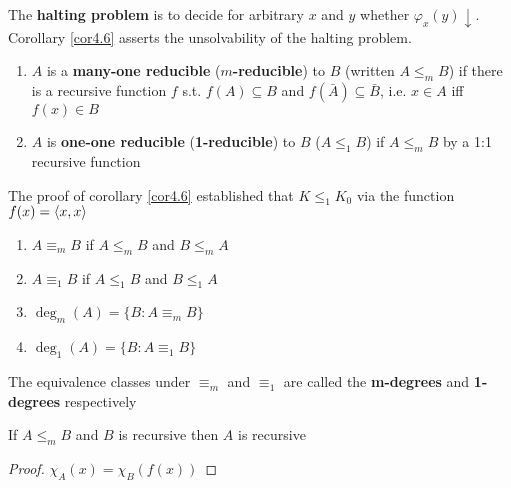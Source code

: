 \documentclass[11pt]{article}
\begin{document}
The \textbf{halting problem} is to decide for arbitrary \(x\) and \(y\) whether
\(\varphi_x(y)\downarrow\). Corollary \ref{cor4.6} asserts the unsolvability of the
halting problem.

\begin{definition}[]
\begin{enumerate}
\item \(A\) is a \textbf{many-one reducible} (\textbf{\(m\)-reducible}) to \(B\) (written
\(A\le_m B\)) if there is a recursive function \(f\) s.t. \(f(A)\subseteq B\) and
\(f(\bar{A})\subseteq\bar{B}\), i.e. \(x\in A\) iff \(f(x)\in B\)
\item \(A\) is \textbf{one-one reducible} (\textbf{1-reducible}) to \(B\) (\(A\le_1 B\)) if
\(A\le_m B\) by a 1:1 recursive function
\end{enumerate}
\end{definition}

The proof of corollary \ref{cor4.6} established that \(K\le_1 K_0\) via the
function \(f(x)=\langle x,x\rangle\)
\begin{definition}[]
\begin{enumerate}
\item \(A\equiv_m B\) if \(A\le_m B\) and \(B\le_m A\)
\item \(A\equiv_1 B\) if \(A\le_1 B\) and \(B\le_1 A\)
\item \(\deg_m(A)=\{B:A\equiv_m B\}\)
\item \(\deg_1(A)=\{B:A\equiv_1 B\}\)
\end{enumerate}
\end{definition}

The equivalence classes under \(\equiv_m\) and \(\equiv_1\) are called the
\textbf{m-degrees} and \textbf{1-degrees} respectively

\begin{proposition}[]
If \(A\le_m B\) and \(B\) is recursive then \(A\) is recursive
\end{proposition}

\begin{proof}
\(\chi_A(x)=\chi_B(f(x))\)
\end{proof}
\end{document}

